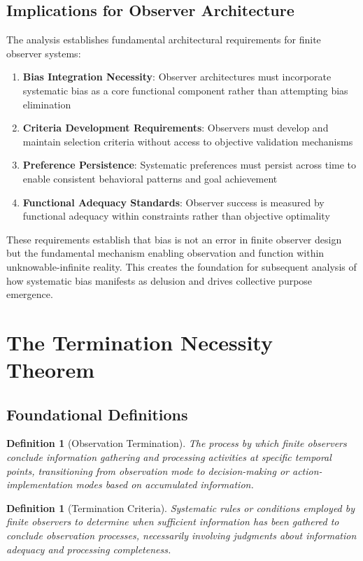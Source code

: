 \documentclass[12pt,a4paper]{article}
\newtheorem{definition}[theorem]{Definition}
\begin{document}
\subsection{Implications for Observer Architecture}

The analysis establishes fundamental architectural requirements for finite observer systems:

\begin{enumerate}
\item \textbf{Bias Integration Necessity}: Observer architectures must incorporate systematic bias as a core functional component rather than attempting bias elimination
\item \textbf{Criteria Development Requirements}: Observers must develop and maintain selection criteria without access to objective validation mechanisms
\item \textbf{Preference Persistence}: Systematic preferences must persist across time to enable consistent behavioral patterns and goal achievement
\item \textbf{Functional Adequacy Standards}: Observer success is measured by functional adequacy within constraints rather than objective optimality
\end{enumerate}

These requirements establish that bias is not an error in finite observer design but the fundamental mechanism enabling observation and function within unknowable-infinite reality. This creates the foundation for subsequent analysis of how systematic bias manifests as delusion and drives collective purpose emergence.

\section{The Termination Necessity Theorem}

\subsection{Foundational Definitions}

\begin{definition}[Observation Termination]
The process by which finite observers conclude information gathering and processing activities at specific temporal points, transitioning from observation mode to decision-making or action-implementation modes based on accumulated information.
\end{definition}

\begin{definition}[Termination Criteria]
Systematic rules or conditions employed by finite observers to determine when sufficient information has been gathered to conclude observation processes, necessarily involving judgments about information adequacy and processing completeness.
\end{definition}
\end{document}
